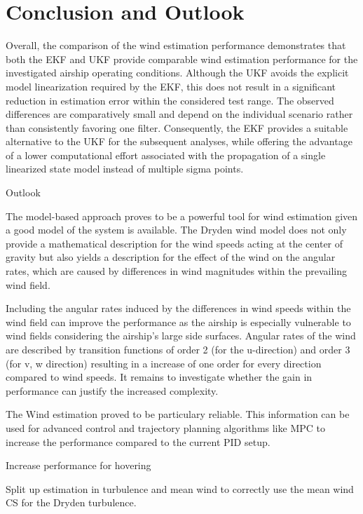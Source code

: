 \chapter{Conclusion and Outlook}

Overall, the comparison of the wind estimation performance demonstrates that both the EKF and UKF provide comparable wind estimation performance for the investigated airship operating conditions. Although the UKF avoids the explicit model linearization required by the EKF, this does not result in a significant reduction in estimation error within the considered test range. The observed differences are comparatively small and depend on the individual scenario rather than consistently favoring one filter. Consequently, the EKF provides a suitable alternative to the UKF for the subsequent analyses, while offering the advantage of a lower computational effort associated with the propagation of a single linearized state model instead of multiple sigma points.





Outlook

The model-based approach proves to be a powerful tool for wind estimation given a good model of the system is available.  
The Dryden wind model does not only provide a mathematical description for the wind speeds acting at the center of gravity but also yields a description for the effect of the wind on the angular rates, which are caused by differences in wind magnitudes within the prevailing wind field.

Including the angular rates induced by the differences in wind speeds within the wind field can improve the performance as the airship is especially vulnerable to wind fields considering the airship's large side surfaces. 
Angular rates of the wind are described by transition functions of order 2 (for the u-direction) and order 3 (for v, w direction) resulting in a increase of one order for every direction compared to wind speeds.
It remains to investigate whether the gain in performance can justify the increased complexity.

The Wind estimation proved to be particulary reliable. This information can be used for advanced control and trajectory planning algorithms like MPC to increase the performance compared to the current PID setup.

Increase performance for hovering

Split up estimation in turbulence and mean wind to correctly use the mean wind CS for the Dryden turbulence.
